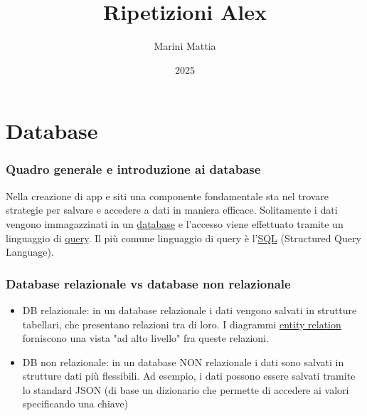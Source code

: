 \endofdump

\usetikzlibrary{external}
\tikzexternalize[prefix=tikz/]




\title{Ripetizioni Alex}
\author{Marini Mattia}
\date{2025}
\lstset{
frame = none
  }


\maketitle
{}
\tableofcontents

\listofexercises

\newpage

\section{Database}
\subsubsection*{Quadro generale e introduzione ai database}
Nella creazione di app e siti una componente fondamentale sta nel trovare strategie per salvare e accedere a dati in maniera efficace. Solitamente i dati vengono immagazzinati in un \underline{database} e l'accesso viene effettuato tramite un linguaggio di \underline{query}. Il più comune linguaggio di query è l'\underline{SQL} (Structured Query Language).
\vskip3mm
\subsubsection*{Database relazionale vs database non relazionale}
\begin{itemize}
	\item DB relazionale:
	      in un database relazionale i dati vengono salvati in strutture tabellari, che presentano relazioni tra di loro. I diagrammi \underline{entity relation} forniscono una vista "ad alto livello" fra queste relazioni.
	\item DB non relazionale:
	      in un database NON relazionale i dati sono salvati in strutture dati più flessibili. Ad esempio, i dati possono essere salvati tramite lo standard JSON (di base un dizionario che permette di accedere ai valori specificando una chiave)
\end{itemize}


